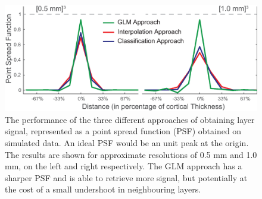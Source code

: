 \begin{figure}[ht]
	\centering
	\includegraphics[width=1.\textwidth, clip=true]{./Chapters/03_GLM/./Images/PointSpread}
	\caption{The performance of the three different approaches of obtaining layer signal, represented as a point spread function (PSF) obtained on simulated data. An ideal PSF would be an unit peak at the origin. The results are shown for approximate resolutions of 0.5 mm and 1.0 mm, on the left and right respectively. The GLM approach has a sharper PSF and is able to retrieve more signal, but potentially at the cost of a small undershoot in neighbouring layers.}
	\label{fig:pointspread}
\end{figure}